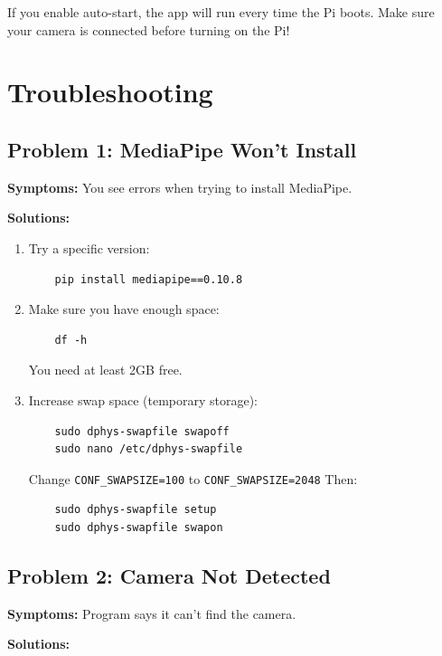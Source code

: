 \documentclass[12pt,a4paper]{article}
\begin{document}
\begin{tipbox}
If you enable auto-start, the app will run every time the Pi boots. Make sure your camera is connected before turning on the Pi!
\end{tipbox}

\section{Troubleshooting}

\subsection{Problem 1: MediaPipe Won't Install}

\textbf{Symptoms:} You see errors when trying to install MediaPipe.

\textbf{Solutions:}

\begin{enumerate}
    \item Try a specific version:
    \begin{lstlisting}
    pip install mediapipe==0.10.8
    \end{lstlisting}
    
    \item Make sure you have enough space:
    \begin{lstlisting}
    df -h
    \end{lstlisting}
    You need at least 2GB free.
    
    \item Increase swap space (temporary storage):
    \begin{lstlisting}
    sudo dphys-swapfile swapoff
    sudo nano /etc/dphys-swapfile
    \end{lstlisting}
    Change \texttt{CONF\_SWAPSIZE=100} to \texttt{CONF\_SWAPSIZE=2048}
    Then:
    \begin{lstlisting}
    sudo dphys-swapfile setup
    sudo dphys-swapfile swapon
    \end{lstlisting}
\end{enumerate}

\subsection{Problem 2: Camera Not Detected}

\textbf{Symptoms:} Program says it can't find the camera.

\textbf{Solutions:}
\end{document}

